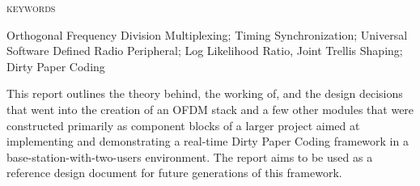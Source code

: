 \abstract

\noindent \textsc{keywords} \hspace*{0.5em} \parbox[t]{4.4in} {Orthogonal
Frequency Division Multiplexing; Timing Synchronization; Universal Software
Defined Radio Peripheral; Log Likelihood Ratio, Joint Trellis Shaping; Dirty
Paper Coding}

\vspace*{24pt}

\noindent This report outlines the theory behind, the working of, and the
design decisions that went into the creation of an OFDM stack and a few other
modules that were constructed primarily as component blocks of a larger
project aimed at implementing and demonstrating a real-time Dirty Paper Coding
framework in a base-station-with-two-users environment. The report aims to be
used as a reference design document for future generations of this framework.
